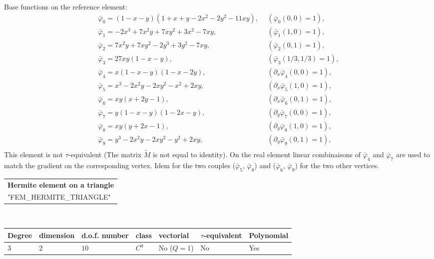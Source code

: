 \documentclass[11pt,a4paper]{article}
\begin{document}
Base functions on the reference element:
$$
  \begin{array}{ll}
 \bar{\varphi}_0 = (1-x-y)(1+x+y-2x^2-2y^2-11xy),~~ & (\bar{\varphi}_0(0,0) = 1), \\
 \bar{\varphi}_1 = -2x^3 + 7 x^2y + 7xy^2 + 3x^2 - 7xy, & (\bar{\varphi}_1(1,0) = 1), \\
 \bar{\varphi}_2 = 7x^2y + 7xy^2 - 2y^3+3y^2-7xy, & (\bar{\varphi}_2(0,1) = 1), \\
 \bar{\varphi}_3 = 27xy(1-x-y), & (\bar{\varphi}_3(1/3,1/3) = 1), \\
 \bar{\varphi}_4 = x(1-x-y)(1-x-2y), & (\partial_x\bar{\varphi}_4(0,0) = 1), \\
 \bar{\varphi}_5 = x^3-2x^2y-2xy^2-x^2+2xy, & (\partial_x\bar{\varphi}_5(1,0) = 1), \\
 \bar{\varphi}_6 = xy(x+2y-1), & (\partial_x\bar{\varphi}_6(0,1) = 1), \\
 \bar{\varphi}_7 = y(1-x-y)(1-2x-y), & (\partial_y\bar{\varphi}_7(0,0) = 1), \\
 \bar{\varphi}_8 = xy(y+2x-1), & (\partial_y\bar{\varphi}_8(1,0) = 1), \\
 \bar{\varphi}_9 = y^3-2x^2y-2xy^2-y^2+2xy, & (\partial_y\bar{\varphi}_9(0,1) = 1), \\
  
  \end{array}
$$
This element is not \mbox{$\tau$-equivalent} (The matrix $\tilde{M}$ is not equal to identity). On the real element linear combinaisons of $\bar{\varphi}_4$ and $\bar{\varphi}_7$ are used to match the gradient on the corresponding vertex. Idem for the two couples ($\bar{\varphi}_5$, $\bar{\varphi}_8$) and  ($\bar{\varphi}_6$, $\bar{\varphi}_9$) for the two other vertices.  

\begin{center}
\begin{tabular}{|m{16.11cm}|} \hline 
{ \bf Hermite element on a triangle}\\
"FEM\_HERMITE\_TRIANGLE"
\end{tabular} \\ \vspace{-1pt} 
\begin{tabular}{|m{2cm}|m{2cm}|m{2.5cm}|m{1.2cm}|m{2cm}|m{2cm}|m{1.8cm}|} \hline 
Degree & dimension & d.o.f. number & class & vectorial & \mbox{$\tau$-equivalent} & Polynomial\\ \hline
$3$ & $2$ & $10$ & $C^0$ & No \mbox{($Q = 1$)} & No & Yes\\ \hline
\end{tabular}
\end{center}
\end{document}
